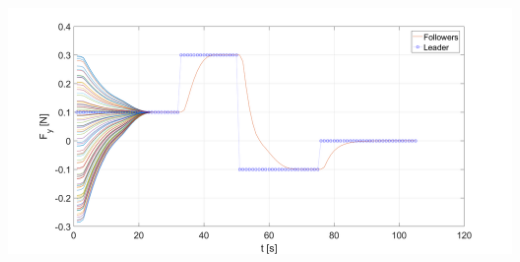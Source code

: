 \documentclass{beamer}
\begin{document}
\begin{frame}
\begin{columns}[c]
\centering
 \includegraphics[width=1\textwidth]{figures/P_ANTS_Fy.png}
\end{columns}

\end{frame}

\end{document}
